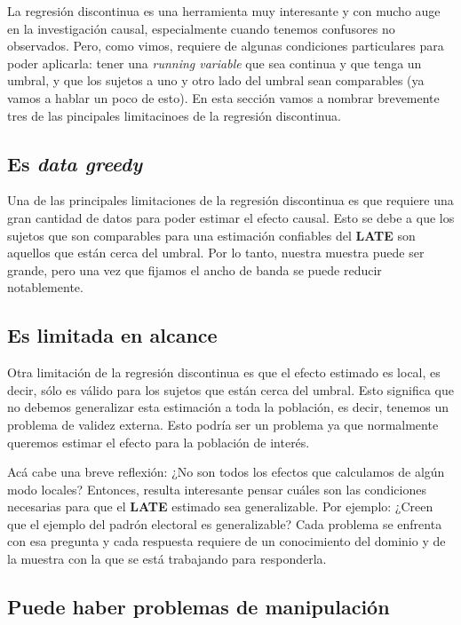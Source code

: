 \documentclass[
  letterpaper,
  DIV=11,
  numbers=noendperiod,
  oneside]{scrreprt}
\begin{document}
La regresión discontinua es una herramienta muy interesante y con mucho
auge en la investigación causal, especialmente cuando tenemos confusores
no observados. Pero, como vimos, requiere de algunas condiciones
particulares para poder aplicarla: tener una \emph{running variable} que
sea continua y que tenga un umbral, y que los sujetos a uno y otro lado
del umbral sean comparables (ya vamos a hablar un poco de esto). En esta
sección vamos a nombrar brevemente tres de las pincipales limitacinoes
de la regresión discontinua.

\hypertarget{es-data-greedy}{%
\subsection{\texorpdfstring{Es \emph{data
greedy}}{Es data greedy}}\label{es-data-greedy}}

Una de las principales limitaciones de la regresión discontinua es que
requiere una gran cantidad de datos para poder estimar el efecto causal.
Esto se debe a que los sujetos que son comparables para una estimación
confiables del \textbf{LATE} son aquellos que están cerca del umbral.
Por lo tanto, nuestra muestra puede ser grande, pero una vez que fijamos
el ancho de banda se puede reducir notablemente.

\hypertarget{es-limitada-en-alcance}{%
\subsection{Es limitada en alcance}\label{es-limitada-en-alcance}}

Otra limitación de la regresión discontinua es que el efecto estimado es
local, es decir, sólo es válido para los sujetos que están cerca del
umbral. Esto significa que no debemos generalizar esta estimación a toda
la población, es decir, tenemos un problema de validez externa. Esto
podría ser un problema ya que normalmente queremos estimar el efecto
para la población de interés.

Acá cabe una breve reflexión: ¿No son todos los efectos que calculamos
de algún modo locales? Entonces, resulta interesante pensar cuáles son
las condiciones necesarias para que el \textbf{LATE} estimado sea
generalizable. Por ejemplo: ¿Creen que el ejemplo del padrón electoral
es generalizable? Cada problema se enfrenta con esa pregunta y cada
respuesta requiere de un conocimiento del dominio y de la muestra con la
que se está trabajando para responderla.

\hypertarget{puede-haber-problemas-de-manipulaciuxf3n}{%
\subsection{\texorpdfstring{Puede haber problemas de
\textbf{manipulación}}{Puede haber problemas de manipulación}}\label{puede-haber-problemas-de-manipulaciuxf3n}}
\end{document}
